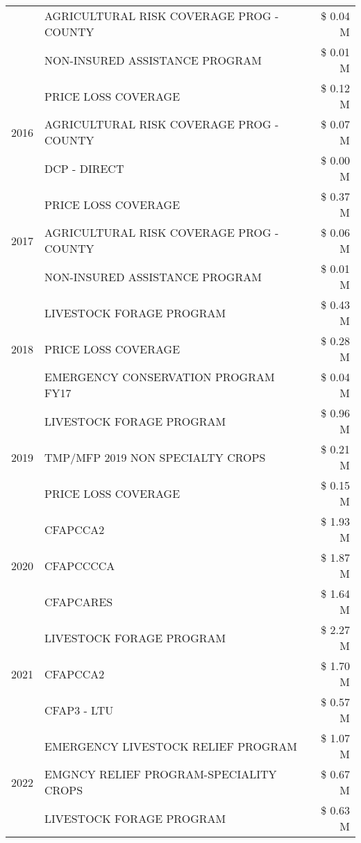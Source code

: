 \begin{tabular}{llr}
 & AGRICULTURAL RISK COVERAGE PROG - COUNTY & \$ 0.04 M \\
 & NON-INSURED ASSISTANCE PROGRAM & \$ 0.01 M \\
\cline{1-3}
\multirow[t]{3}{*}{2016} & PRICE LOSS COVERAGE & \$ 0.12 M \\
 & AGRICULTURAL RISK COVERAGE PROG - COUNTY & \$ 0.07 M \\
 & DCP - DIRECT & \$ 0.00 M \\
\cline{1-3}
\multirow[t]{3}{*}{2017} & PRICE LOSS COVERAGE & \$ 0.37 M \\
 & AGRICULTURAL RISK COVERAGE PROG - COUNTY & \$ 0.06 M \\
 & NON-INSURED ASSISTANCE PROGRAM & \$ 0.01 M \\
\cline{1-3}
\multirow[t]{3}{*}{2018} & LIVESTOCK FORAGE PROGRAM & \$ 0.43 M \\
 & PRICE LOSS COVERAGE & \$ 0.28 M \\
 & EMERGENCY CONSERVATION PROGRAM FY17 & \$ 0.04 M \\
\cline{1-3}
\multirow[t]{3}{*}{2019} & LIVESTOCK FORAGE PROGRAM & \$ 0.96 M \\
 & TMP/MFP 2019 NON SPECIALTY CROPS & \$ 0.21 M \\
 & PRICE LOSS COVERAGE & \$ 0.15 M \\
\cline{1-3}
\multirow[t]{3}{*}{2020} & CFAPCCA2 & \$ 1.93 M \\
 & CFAPCCCCA & \$ 1.87 M \\
 & CFAPCARES & \$ 1.64 M \\
\cline{1-3}
\multirow[t]{3}{*}{2021} & LIVESTOCK FORAGE PROGRAM & \$ 2.27 M \\
 & CFAPCCA2 & \$ 1.70 M \\
 & CFAP3 - LTU & \$ 0.57 M \\
\cline{1-3}
\multirow[t]{3}{*}{2022} & EMERGENCY LIVESTOCK RELIEF PROGRAM & \$ 1.07 M \\
 & EMGNCY RELIEF PROGRAM-SPECIALITY CROPS & \$ 0.67 M \\
 & LIVESTOCK FORAGE PROGRAM & \$ 0.63 M \\
\cline{1-3}
\bottomrule
\end{tabular}
